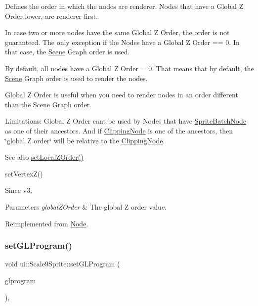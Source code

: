 Defines the order in which the nodes are renderer. Nodes that have a Global Z Order lower, are renderer first.

In case two or more nodes have the same Global Z Order, the order is not guaranteed. The only exception if the Nodes have a Global Z Order == 0. In that case, the \hyperlink{classScene}{Scene} Graph order is used.

By default, all nodes have a Global Z Order = 0. That means that by default, the \hyperlink{classScene}{Scene} Graph order is used to render the nodes.

Global Z Order is useful when you need to render nodes in an order different than the \hyperlink{classScene}{Scene} Graph order.

Limitations\+: Global Z Order can\textquotesingle{}t be used by Nodes that have \hyperlink{classSpriteBatchNode}{Sprite\+Batch\+Node} as one of their ancestors. And if \hyperlink{classClippingNode}{Clipping\+Node} is one of the ancestors, then \char`\"{}global Z order\char`\"{} will be relative to the \hyperlink{classClippingNode}{Clipping\+Node}.

\begin{DoxySeeAlso}{See also}
{\ttfamily \hyperlink{classNode_aee4e616c2d55b722226aae1e68b4946f}{set\+Local\+Z\+Order()}} 

{\ttfamily set\+Vertex\+Z()}
\end{DoxySeeAlso}
\begin{DoxySince}{Since}
v3.
\end{DoxySince}

\begin{DoxyParams}{Parameters}
{\em global\+Z\+Order} & The global Z order value. \\
\hline
\end{DoxyParams}


Reimplemented from \hyperlink{classNode_a32a5b9cb9a408d04008c4935a4776566}{Node}.

\mbox{\label{classui_1_1Scale9Sprite_add60f59da603e007e2d4794d667f40bb}} 
\subsubsection{\texorpdfstring{set\+G\+L\+Program()}{setGLProgram()}}
{\footnotesize\ttfamily void ui\+::\+Scale9\+Sprite\+::set\+G\+L\+Program (\begin{DoxyParamCaption}\item[{\hyperlink{classGLProgram}{G\+L\+Program} $\ast$}]{glprogram }\end{DoxyParamCaption})\hspace{0.3cm}{\ttfamily [override]}, {\ttfamily [virtual]}}

